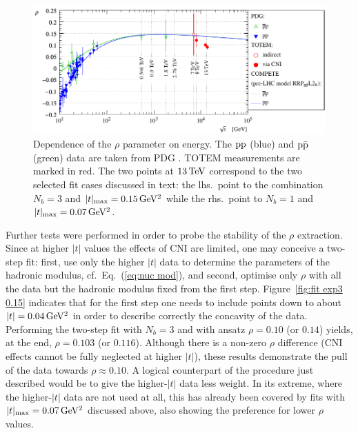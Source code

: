 \begin{figure}
\vskip-5mm
\begin{center}
\includegraphics{fig/rho_vs_s.pdf}
\caption{%
Dependence of the $\rho$ parameter on energy. The $\rm pp$ (blue) and $\rm p\bar p$ (green) data are taken from PDG \cite{pdg-2010}. TOTEM measurements are marked in red. The two points at $13\,{\rm TeV}$ correspond to the two selected fit cases discussed in text: the lhs.~point to the combination $N_b = 3$ and $|t|_{\rm max} = 0.15\,{\rm GeV^2}$ while the rhs.~point to $N_b = 1$ and $|t|_{\rm max} = 0.07\,{\rm GeV^2}$.
}
\label{fig:rho_vs_s}
\end{center}
\end{figure}

Further tests were performed in order to probe the stability of the $\rho$ extraction. Since at higher $|t|$ values the effects of CNI are limited, one may conceive a two-step fit: first, use only the higher $|t|$ data to determine the parameters of the hadronic modulus, cf.~Eq.~(\ref{eq:nuc mod}), and second, optimise only $\rho$ with all the data but the hadronic modulus fixed from the first step. Figure~\ref{fig:fit exp3 0.15} indicates that for the first step one needs to include points down to about $|t| = 0.04\,{\rm GeV^2}$ in order to describe correctly the concavity of the data. Performing the two-step fit with $N_b=3$ and with ansatz $\rho = 0.10$ (or $0.14$) yields, at the end, $\rho = 0.103$ (or $0.116$). Although there is a non-zero $\rho$ difference (CNI effects cannot be fully neglected at higher $|t|$), these results demonstrate the pull of the data towards $\rho \approx 0.10$. A logical counterpart of the procedure just described would be to give the higher-$|t|$ data less weight. In its extreme, where the higher-$|t|$ data are not used at all, this has already been covered by fits with $|t|_{\rm max} = 0.07\,{\rm GeV^2}$ discussed above, also showing the preference for lower $\rho$ values.


